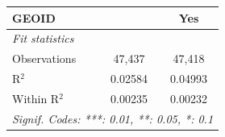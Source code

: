 \begin{tabular}{lcc}
   GEOID                                                               &                & Yes\\  
   \midrule
   \emph{Fit statistics}\\
   Observations                                                        & 47,437         & 47,418\\  
   R$^2$                                                               & 0.02584        & 0.04993\\  
   Within R$^2$                                                        & 0.00235        & 0.00232\\  
   \midrule \midrule
   \multicolumn{3}{l}{\emph{Signif. Codes: ***: 0.01, **: 0.05, *: 0.1}}\\
\end{tabular}
\par\endgroup
\begingroup
\centering
